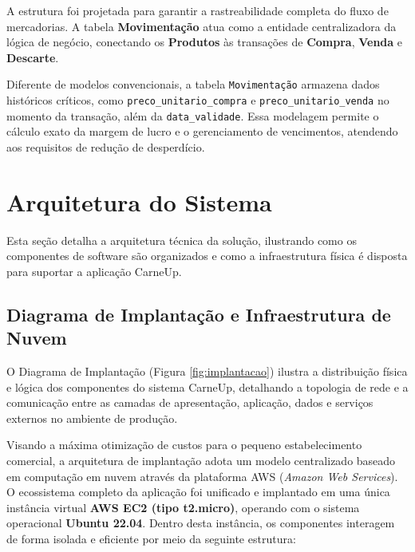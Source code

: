 \documentclass[
	12pt,				%
	openany,			%
	oneside,			%
	a4paper,			%
	english,			%
	french,				%
	spanish,			%
	brazil				%
	]{abntex2}
\begin{document}
A estrutura foi projetada para garantir a rastreabilidade completa do fluxo de mercadorias. A tabela \textbf{Movimentação} atua como a entidade centralizadora da lógica de negócio, conectando os \textbf{Produtos} às transações de \textbf{Compra}, \textbf{Venda} e \textbf{Descarte}.

Diferente de modelos convencionais, a tabela \texttt{Movimentação} armazena dados históricos críticos, como \texttt{preco\_unitario\_compra} e \texttt{preco\_unitario\_venda} no momento da transação, além da \texttt{data\_validade}. Essa modelagem permite o cálculo exato da margem de lucro e o gerenciamento de vencimentos, atendendo aos requisitos de redução de desperdício.

\section{Arquitetura do Sistema}

Esta seção detalha a arquitetura técnica da solução, ilustrando como os componentes de software são organizados e como a infraestrutura física é disposta para suportar a aplicação CarneUp.

\subsection{Diagrama de Implantação e Infraestrutura de Nuvem}

O Diagrama de Implantação (Figura \ref{fig:implantacao}) ilustra a distribuição física e lógica dos componentes do sistema CarneUp, detalhando a topologia de rede e a comunicação entre as camadas de apresentação, aplicação, dados e serviços externos no ambiente de produção.

Visando a máxima otimização de custos para o pequeno estabelecimento comercial, a arquitetura de implantação adota um modelo centralizado baseado em computação em nuvem através da plataforma AWS (\textit{Amazon Web Services}). O ecossistema completo da aplicação foi unificado e implantado em uma única instância virtual \textbf{AWS EC2 (tipo t2.micro)}, operando com o sistema operacional \textbf{Ubuntu 22.04}. Dentro desta instância, os componentes interagem de forma isolada e eficiente por meio da seguinte estrutura:
\end{document}

